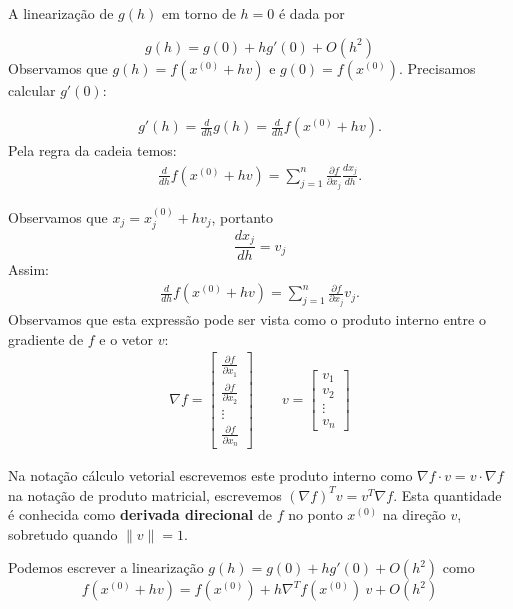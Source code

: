 A linearização de $g(h)$ em torno de $h=0$ é dada por

\begin{equation} g(h)=g(0) + hg'(0) +O(h^2) \end{equation}
Observamos que $g(h)=f(x^{(0)}+hv)$ e $g(0)=f(x^{(0)})$. Precisamos calcular $g'(0)$:

\begin{eqnarray}
g'(h)=\frac{d}{dh}g(h)=\frac{d}{dh}f(x^{(0)}+hv).
\end{eqnarray}
Pela regra da cadeia temos:
\begin{eqnarray}
\frac{d}{dh}f(x^{(0)}+hv)= \sum_{j=1}^n \frac{\partial f}{\partial x_j}\frac{d x_j}{d h}.
\end{eqnarray}

Observamos que $x_j=x^{(0)}_j+hv_j$, portanto
\begin{equation} \frac{d x_j}{d h}=v_j \end{equation}
Assim:
\begin{eqnarray}
\frac{d}{dh}f(x^{(0)}+hv)= \sum_{j=1}^n \frac{\partial f}{\partial x_j}v_j.
\end{eqnarray}
Observamos que esta expressão pode ser vista como o produto interno entre o gradiente de $f$ e o vetor $v$:
\begin{eqnarray}
\nabla f = \left[
\begin{matrix}
\frac{\partial f}{\partial x_1} \\
\frac{\partial f}{\partial x_2} \\
\vdots\\
\frac{\partial f}{\partial x_n}
\end{matrix}
\right] \qquad v=\left[
\begin{matrix}
v_1\\
v_2\\
\vdots\\
v_n
\end{matrix}
\right]
\end{eqnarray}

Na notação cálculo vetorial escrevemos este produto interno como $\nabla f \cdot v = v \cdot \nabla f$ na notação de produto matricial, escrevemos $\left(\nabla f\right)^T v = v^T\nabla f$. Esta quantidade é conhecida como {\bf derivada direcional} de $f$ no ponto $x^{(0)}$ na direção $v$, sobretudo quando $\|v\|=1$.


Podemos escrever a linearização
$g(h)=g(0) + hg'(0) +O(h^2)$ como
\begin{equation} f(x^{(0)}+hv)=f(x^{(0)})+ h \nabla^T\! f(x^{(0)})\!~v  + O(h^2) \end{equation}

